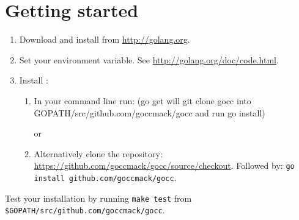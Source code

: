 \documentclass[12pt]{article}
\begin{document}
\section{Getting started}
	\begin{enumerate}
		\item Download and install \Go from \url{http://golang.org}.

		\item Set your  environment variable. See \url{http://golang.org/doc/code.html}.

		\item Install \gocc:
			\begin{enumerate}
				\item In your command line run:  (go get will git clone gocc into GOPATH/src/github.com/goccmack/gocc and run go install)

					or

				\item Alternatively clone the repository: \url{https://github.com/goccmack/gocc/source/checkout}. Followed by:
				\verb|go install github.com/goccmack/gocc|.
			\end{enumerate}

	\end{enumerate}

	Test your installation by running \verb|make test| from \verb|$GOPATH/src/github.com/goccmack/gocc|.
\end{document}
